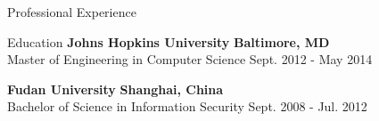 \documentclass{resume} %
\begin{document}
\begin{rSection}{Professional Experience}

\end{rSection}

\begin{rSection}{Education}
{\bf Johns Hopkins University} \hfill {\bf Baltimore, MD} \\
{Master of Engineering in Computer Science} \hfill {Sept. 2012 - May 2014}

{\bf Fudan University} \hfill {\bf Shanghai, China} \\
{Bachelor of Science in Information Security} \hfill {Sept. 2008 - Jul. 2012}
\end{rSection}
\end{document}
